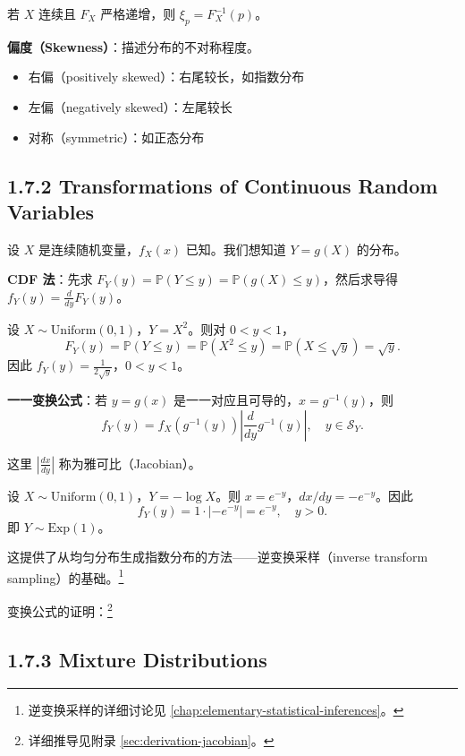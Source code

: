 若 $X$ 连续且 $F_X$ 严格递增，则 $\xi_p = F_X^{-1}(p)$。

\textbf{偏度（Skewness）}：描述分布的不对称程度。
\begin{itemize}
    \item 右偏（positively skewed）：右尾较长，如指数分布
    \item 左偏（negatively skewed）：左尾较长
    \item 对称（symmetric）：如正态分布
\end{itemize}

\subsection{1.7.2 Transformations of Continuous Random Variables}

设 $X$ 是连续随机变量，$f_X(x)$ 已知。我们想知道 $Y = g(X)$ 的分布。

\textbf{CDF 法}：先求 $F_Y(y) = \mathbb{P}(Y \leq y) = \mathbb{P}(g(X) \leq y)$，然后求导得 $f_Y(y) = \frac{d}{dy} F_Y(y)$。

\begin{example}[连续变换]\label{ex:continuous-transform-ch1}
设 $X \sim \text{Uniform}(0, 1)$，$Y = X^2$。则对 $0 < y < 1$，
\[
F_Y(y) = \mathbb{P}(Y \leq y) = \mathbb{P}(X^2 \leq y) = \mathbb{P}(X \leq \sqrt{y}) = \sqrt{y}.
\]
因此 $f_Y(y) = \frac{1}{2\sqrt{y}}$，$0 < y < 1$。
\end{example}

\textbf{一一变换公式}：若 $y = g(x)$ 是一一对应且可导的，$x = g^{-1}(y)$，则
\[
f_Y(y) = f_X(g^{-1}(y)) \left| \frac{d}{dy} g^{-1}(y) \right|, \quad y \in \mathcal{S}_Y.
\tag{1.7.3}\label{eq:one-to-one-transform-ch1}
\]

这里 $|\frac{dx}{dy}|$ 称为雅可比（Jacobian）。

\begin{example}[对数变换]\label{ex:log-transform-ch1}
设 $X \sim \text{Uniform}(0, 1)$，$Y = -\log X$。则 $x = e^{-y}$，$dx/dy = -e^{-y}$。因此
\[
f_Y(y) = 1 \cdot |-e^{-y}| = e^{-y}, \quad y > 0.
\]
即 $Y \sim \text{Exp}(1)$。

这提供了从均匀分布生成指数分布的方法——逆变换采样（inverse transform sampling）的基础。\footnote{逆变换采样的详细讨论见 \cref{chap:elementary-statistical-inferences}。}
\end{example}

变换公式的证明：\footnote{详细推导见附录 \cref{sec:derivation-jacobian}。}

\subsection{1.7.3 Mixture Distributions}

